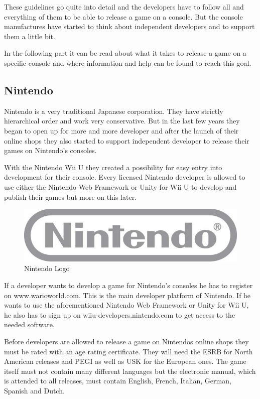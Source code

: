 These guidelines go quite into detail and the developers have to follow all and everything of them to be able to release a game on a console. But the console manufactures have started to think about independent developers and to support them a little bit.

In the following part it can be read about what it takes to release a game on a specific console and where information and help can be found to reach this goal.

\subsection{Nintendo}
\label{subsec:nintendo}
Nintendo is a very traditional Japanese corporation. They have strictly hierarchical order and work very conservative. But in the last few years they began to open up for more and more developer and after the launch of their online shops they also started to support independent developer to release their games on Nintendo's consoles.

With the Nintendo Wii U they created a possibility for easy entry into development for their console. Every licensed Nintendo developer is allowed to use either the Nintendo Web Framework or Unity for Wii U to develop and publish their games but more on this later.

\begin{figure}[!hbp]
\includegraphics[width=\linewidth]{img/nintendo.jpg}
\centering
\caption{ Nintendo Logo }
\label{fig:nintendo}
\end{figure}

If a developer wants to develop a game for Nintendo's consoles he has to register on www.warioworld.com. This is the main developer platform of Nintendo. If he wants to use the aforementioned Nintendo Web Framework or Unity for Wii U, he also has to sign up on wiiu-developers.nintendo.com to get access to the needed software.

Before developers are allowed to release a game on Nintendos online shops they must be rated with an age rating certificate. They will need the ESRB for North American releases and PEGI as well as USK for the European ones. The game itself must not contain many different languages but the electronic manual, which is attended to all releases, must contain English, French, Italian, German, Spanish and Dutch.

